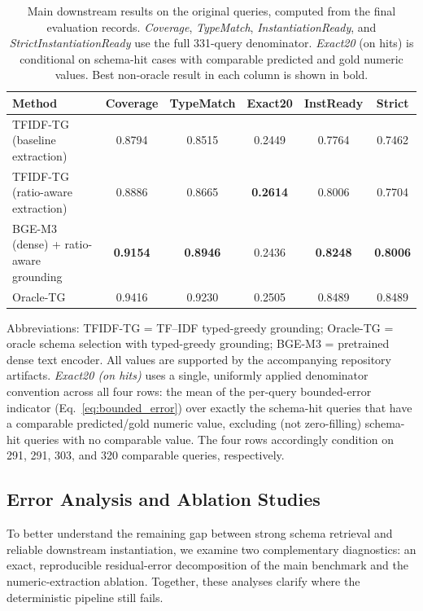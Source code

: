 \documentclass[3p]{elsarticle}
\begin{document}
\begin{table}[t]
  \centering
  \caption{Main downstream results on the original queries, computed from the final evaluation records. \textit{Coverage}, \textit{TypeMatch}, \textit{InstantiationReady}, and \textit{StrictInstantiationReady} use the full 331-query denominator. \textit{Exact20} (on hits) is conditional on schema-hit cases with comparable predicted and gold numeric values. Best non-oracle result in each column is shown in bold.}
  \label{tab:nlp4lp-downstream-main}
  \small
  \setlength{\tabcolsep}{3.8pt}
  \begin{tabular}{lccccc}
    \toprule
    Method & Coverage & TypeMatch & Exact20 & InstReady & Strict \\
    \midrule
    TFIDF-TG (baseline extraction) & 0.8794 & 0.8515 & 0.2449 & 0.7764 & 0.7462 \\
    TFIDF-TG (ratio-aware extraction) & 0.8886 & 0.8665 & \textbf{0.2614} & 0.8006 & 0.7704 \\
    BGE-M3 (dense) + ratio-aware grounding & \textbf{0.9154} & \textbf{0.8946} & 0.2436 & \textbf{0.8248} & \textbf{0.8006} \\
    Oracle-TG & 0.9416 & 0.9230 & 0.2505 & 0.8489 & 0.8489 \\
    \bottomrule
  \end{tabular}

  \vspace{2mm}
  \raggedright
  \footnotesize
  Abbreviations: TFIDF-TG = TF--IDF typed-greedy grounding; Oracle-TG = oracle schema selection with typed-greedy grounding; BGE-M3 = pretrained dense text encoder. All values are supported by the accompanying repository artifacts. \textit{Exact20 (on hits)} uses a single, uniformly applied denominator convention across all four rows: the mean of the per-query bounded-error indicator (Eq.~\eqref{eq:bounded_error}) over exactly the schema-hit queries that have a comparable predicted/gold numeric value, excluding (not zero-filling) schema-hit queries with no comparable value. The four rows accordingly condition on 291, 291, 303, and 320 comparable queries, respectively.
\end{table}

\subsection{Error Analysis and Ablation Studies}
\label{subsec:exp_error}

To better understand the remaining gap between strong schema retrieval and reliable downstream instantiation, we examine two complementary diagnostics: an exact, reproducible residual-error decomposition of the main benchmark and the numeric-extraction ablation. Together, these analyses clarify where the deterministic pipeline still fails.
\end{document}
